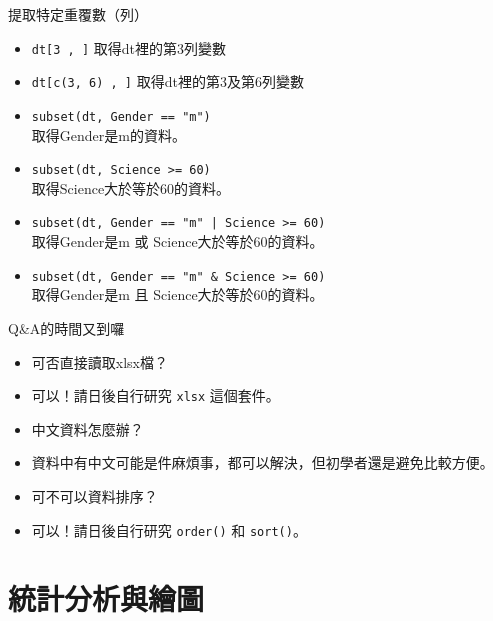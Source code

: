 \documentclass[14pt, aspectratio=43]{beamer}
\begin{document}
\begin{frame}[fragile]{提取特定重覆數（列）}
\begin{itemize}
\item \verb+dt[3 , ]+ 取得dt裡的第3列變數
\item \verb+dt[c(3, 6) , ]+ 取得dt裡的第3及第6列變數
\item \verb+subset(dt, Gender == "m")+ \\ 取得Gender是m的資料。
\item \verb+subset(dt, Science >= 60)+ \\ 取得Science大於等於60的資料。
\item \verb+subset(dt, Gender == "m" | Science >= 60)+ \\ 取得Gender是m \alert{或} Science大於等於60的資料。
\item \verb+subset(dt, Gender == "m" & Science >= 60)+ \\ 取得Gender是m \alert{且} Science大於等於60的資料。
\end{itemize}
\end{frame}

\begin{frame}[fragile]{Q\&A的時間又到囉}
\begin{itemize}
\item[Q] 可否直接讀取xlsx檔？\\
\item[A] 可以！請日後自行研究 \verb+xlsx+ 這個套件。
\end{itemize}
\begin{itemize}
\item[Q] 中文資料怎麼辦？\\
\item[A] 資料中有中文可能是件麻煩事，都可以解決，但初學者還是避免比較方便。
\end{itemize}
\begin{itemize}
\item[Q] 可不可以資料排序？\\
\item[A] 可以！請日後自行研究 \verb+order()+ 和 \verb+sort()+。
\end{itemize}
\end{frame}


\section{統計分析與繪圖}\subsection{}
\end{document}

